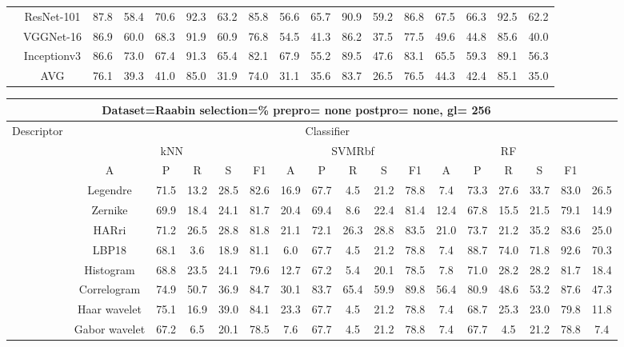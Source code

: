 \documentclass[12pt,italian]{article}
\begin{document}
\begin{tiny}
\begin{longtable}{lcccccccccccccccc}
& ResNet-101 & 87.8 & 58.4 & 70.6 & 92.3 & 63.2 & 85.8 & 56.6 & 65.7 & 90.9 & 59.2 & 86.8 & 67.5 & 66.3 & 92.5 & 62.2 \\ 
& VGGNet-16 & 86.9 & 60.0 & 68.3 & 91.9 & 60.9 & 76.8 & 54.5 & 41.3 & 86.2 & 37.5 & 77.5 & 49.6 & 44.8 & 85.6 & 40.0 \\ 
& Inceptionv3 & 86.6 & 73.0 & 67.4 & 91.3 & 65.4 & 82.1 & 67.9 & 55.2 & 89.5 & 47.6 & 83.1 & 65.5 & 59.3 & 89.1 & 56.3 \\ 
\hline
& AVG & 76.1 & 39.3 & 41.0 & 85.0 & 31.9 & 74.0 & 31.1 & 35.6 & 83.7 & 26.5 & 76.5 & 44.3 & 42.4 & 85.1 & 35.0 \\ 
\hline
\bottomrule
\end{longtable} 

 \pagebreak 
\begin{longtable}{lcccccccccccccccc}
\toprule
\multicolumn{16}{c}{Dataset=Raabin selection=\% prepro= none postpro= none, gl= 256} \\ 
\toprule
Descriptor & \multicolumn{15}{c}{Classifier} \\ 
& \multicolumn{5}{c}{kNN} & \multicolumn{5}{c}{SVMRbf} & \multicolumn{5}{c}{RF} \\ 
& A & P & R & S & F1 & A & P & R & S & F1 & A & P & R & S & F1 \\ 
\midrule
& Legendre & 71.5 & 13.2 & 28.5 & 82.6 & 16.9 & 67.7 &  4.5 & 21.2 & 78.8 &  7.4 & 73.3 & 27.6 & 33.7 & 83.0 & 26.5 \\ 
& Zernike & 69.9 & 18.4 & 24.1 & 81.7 & 20.4 & 69.4 &  8.6 & 22.4 & 81.4 & 12.4 & 67.8 & 15.5 & 21.5 & 79.1 & 14.9 \\ 
& HARri & 71.2 & 26.5 & 28.8 & 81.8 & 21.1 & 72.1 & 26.3 & 28.8 & 83.5 & 21.0 & 73.7 & 21.2 & 35.2 & 83.6 & 25.0 \\ 
& LBP18 & 68.1 &  3.6 & 18.9 & 81.1 &  6.0 & 67.7 &  4.5 & 21.2 & 78.8 &  7.4 & 88.7 & 74.0 & 71.8 & 92.6 & 70.3 \\ 
& Histogram & 68.8 & 23.5 & 24.1 & 79.6 & 12.7 & 67.2 &  5.4 & 20.1 & 78.5 &  7.8 & 71.0 & 28.2 & 28.2 & 81.7 & 18.4 \\ 
& Correlogram & 74.9 & 50.7 & 36.9 & 84.7 & 30.1 & 83.7 & 65.4 & 59.9 & 89.8 & 56.4 & 80.9 & 48.6 & 53.2 & 87.6 & 47.3 \\ 
& Haar wavelet & 75.1 & 16.9 & 39.0 & 84.1 & 23.3 & 67.7 &  4.5 & 21.2 & 78.8 &  7.4 & 68.7 & 25.3 & 23.0 & 79.8 & 11.8 \\ 
& Gabor wavelet & 67.2 &  6.5 & 20.1 & 78.5 &  7.6 & 67.7 &  4.5 & 21.2 & 78.8 &  7.4 & 67.7 &  4.5 & 21.2 & 78.8 &  7.4 \\ 

\end{longtable}
\end{tiny}
\end{document}
